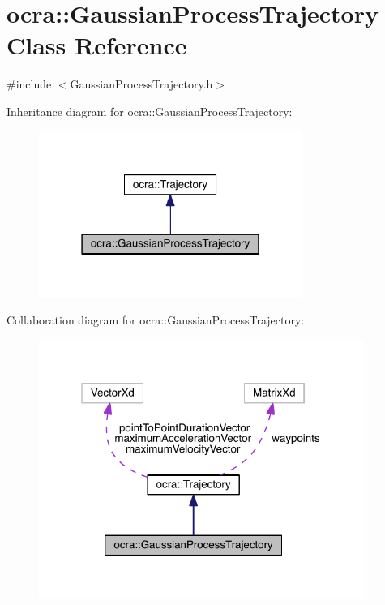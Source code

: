 \hypertarget{classocra_1_1GaussianProcessTrajectory}{}\section{ocra\+:\+:Gaussian\+Process\+Trajectory Class Reference}
\label{classocra_1_1GaussianProcessTrajectory}


{\ttfamily \#include $<$Gaussian\+Process\+Trajectory.\+h$>$}



Inheritance diagram for ocra\+:\+:Gaussian\+Process\+Trajectory\+:\nopagebreak
\begin{figure}[H]
\begin{center}
\leavevmode
\includegraphics[width=243pt]{dc/d69/classocra_1_1GaussianProcessTrajectory__inherit__graph}
\end{center}
\end{figure}


Collaboration diagram for ocra\+:\+:Gaussian\+Process\+Trajectory\+:\nopagebreak
\begin{figure}[H]
\begin{center}
\leavevmode
\includegraphics[width=301pt]{d1/d1f/classocra_1_1GaussianProcessTrajectory__coll__graph}
\end{center}
\end{figure}
